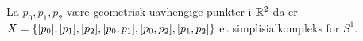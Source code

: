 \begin{eksempel}\label{eks:Sirkel}
  La $p_0,p_1,p_2$ være geometrisk uavhengige punkter
  i $\mathbb{R}^2$ da er $X
  = \left\{[p_0],[p_1],[p_2],[p_0,p_1],[p_0,p_2],[p_1,p_2]\right\}$ et
  simplisialkompleks for $S^1$.
\end{eksempel}




%
